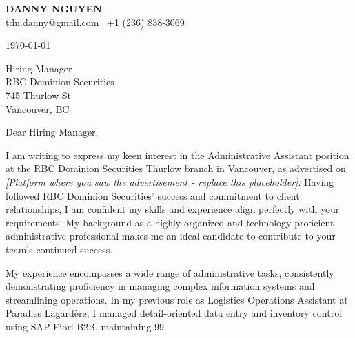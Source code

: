 \documentclass[letterpaper,11pt]{article}
\begin{document}
\textbf{DANNY NGUYEN} \\
tdn.danny@gmail.com \textbullet\ +1 (236) 838-3069 \\
\vspace{20pt}

\today \\
\vspace{20pt}

Hiring Manager \\
RBC Dominion Securities \\
745 Thurlow St \\
Vancouver, BC \\
\vspace{20pt}

Dear Hiring Manager, \\
\vspace{10pt}

I am writing to express my keen interest in the Administrative Assistant position at the RBC Dominion Securities Thurlow branch in Vancouver, as advertised on \textit{[Platform where you saw the advertisement -  replace this placeholder]}.  Having followed RBC Dominion Securities' success and commitment to client relationships, I am confident my skills and experience align perfectly with your requirements.  My background as a highly organized and technology-proficient administrative professional makes me an ideal candidate to contribute to your team's continued success.

\vspace{10pt}

My experience encompasses a wide range of administrative tasks, consistently demonstrating proficiency in managing complex information systems and streamlining operations.  In my previous role as Logistics Operations Assistant at Paradies Lagardère, I managed detail-oriented data entry and inventory control using SAP Fiori B2B, maintaining 99%

\vspace{10pt}
\end{document}
